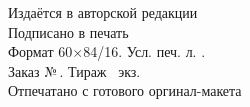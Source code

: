 \newpage
\thispagestyle{empty}
~\vfill
\begin{centering}
  \textit{\EdType}\\[18pt]
  \AuthorI\\[6pt]
  {\large\Title}\\[6pt]
  \PubType\\[18pt]
  Издаётся в авторской редакции\\
  \vspace{18pt}
  Подписано в печать \PUBDATE\\
  Формат 60×84/16. Усл. печ. л. \SHEETS.\\
  Заказ №\,\PUBORDER. Тираж \PUBCOUNT\ экз.\\
  \vspace{6pt}
  Отпечатано с готового оргинал-макета\\
  \PUBLISHER\\
  \PUBADDR\\
\end{centering}
\vspace{1cm}
